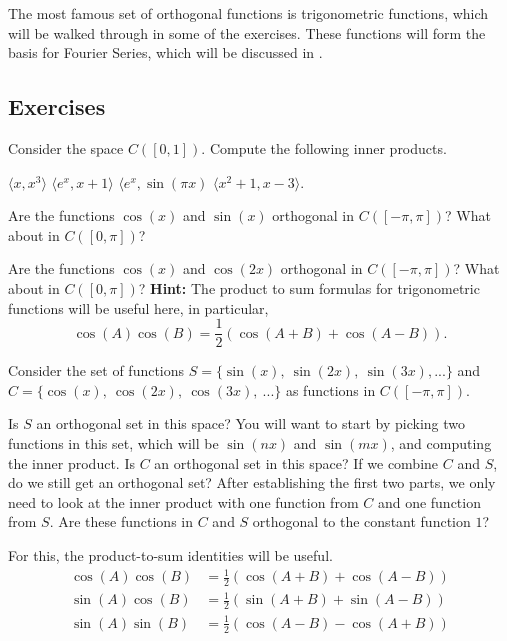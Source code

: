 The most famous set of orthogonal functions is trigonometric functions, which will be walked through in some of the exercises. These functions will form the basis for Fourier Series, which will be discussed in . 

\subsection{Exercises}

\begin{exercise}
Consider the space $C([0,1])$. Compute the following inner products. 
\begin{tasks}
\task $\langle x, x^3 \rangle$
\task $\langle e^x, x+1 \rangle$
\task $\langle e^x, \sin(\pi x)$
\task $\langle x^2 + 1, x - 3 \rangle$. 
\end{tasks}
\end{exercise}

\begin{exercise}
Are the functions $\cos(x)$ and $\sin(x)$ orthogonal in $C([-\pi, \pi])$? What about in $C([0,\pi])$?
\end{exercise}

\begin{exercise}
Are the functions $\cos(x)$ and $\cos(2x)$ orthogonal in $C([-\pi, \pi])$? What about in $C([0,\pi])$? \textbf{Hint:} The product to sum formulas for trigonometric functions will be useful here, in particular,
\[ \cos(A)\cos(B) = \frac{1}{2}\left(\cos(A+B) + \cos(A-B)\right). \]
\end{exercise}

\begin{exercise}
Consider the set of functions $S = \{\sin(x),\ \sin(2x),\ \sin(3x), ... \}$ and $C = \{\cos(x),\  \cos(2x),\ \cos(3x),\ ... \}$ as functions in $C([-\pi, \pi])$. 
\begin{tasks}
\task Is $S$ an orthogonal set in this space? You will want to start by picking two functions in this set, which will be $\sin(nx)$ and $\sin(mx)$, and computing the inner product.
\task Is $C$ an orthogonal set in this space?
\task If we combine $C$ and $S$, do we still get an orthogonal set? After establishing the first two parts, we only need to look at the inner product with one function from $C$ and one function from $S$. 
\task Are these functions in $C$ and $S$ orthogonal to the constant function $1$?
\end{tasks}
For this, the product-to-sum identities will be useful. 
\[ 
\begin{split}
\cos(A)\cos(B) &= \frac{1}{2}\left(\cos(A+B) + \cos(A-B)\right)\\
\sin(A)\cos(B) &= \frac{1}{2}\left(\sin(A+B) + \sin(A-B)\right) \\
\sin(A)\sin(B) &= \frac{1}{2}\left(\cos(A-B) - \cos(A+B)\right)
\end{split}
 \]
\end{exercise}